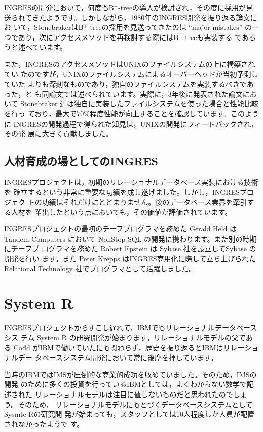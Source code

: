 INGRESの開発において，何度もB$^+$-treeの導入が検討され，その度に採用が見
送られてきたようです。しかしながら，1980年のINGRES開発を振り返る論文にお
いて，StonebrakerはB$^+$-treeの採用を見送ってきたのは ``major mistakes''
の一つであり，次にアクセスメソッドを再検討する際にはB$^+$-treeも実装する
であろうと述べています。


また，INGRESのアクセスメソッドはUNIXのファイルシステムの上に構築されてい
たのですが，UNIXのファイルシステムによるオーバーヘッドが当初予測していた
よりも深刻なものであり，独自のファイルシステムを実装するべきであった，と
も同論文では述べられています。実際に，3年後に発表された論文において
Stonebraker 達は独自に実装したファイルシステムを使った場合と性能比較を行っ
ており，最大で70\%程度性能が向上することを確認しています。このように
INGRESの開発過程で得られた知見は，UNIXの開発にフィードバックされ，その発
展に大きく貢献しました。


\subsection{人材育成の場としてのINGRES}


INGRESプロジェクトは，初期のリレーショナルデータベース実装における技術を
確立するという非常に重要な功績を成し遂げました。しかし，INGRESプロジェク
トの功績はそれだけにとどまりません。後のデータベース業界を牽引する人材を
輩出したという点においても，その価値が評価されています。


INGRESプロジェクトの最初のチーフプログラマを務めた Gerald Held はTandem
Computers において NonStop SQL の開発に携わります。また別の時期にチーフプ
ログラマを務めた Robert Epstein は Sybase 社を設立してSybase の開発を行い
ます。また Peter Krepps はINGRES商用化に際して立ち上げられた Relational
Technology 社でプログラマとして活躍しました。


\section{System R}


INGRESプロジェクトからすこし遅れて，IBMでもリレーショナルデータベースシス
テム System R の研究開発が始まります。リレーショナルモデルの父である
Codd がIBMで働いていたにも関わらず，歴史を振り返るとIBMはリレーショナルデー
タベースシステム開発において常に後塵を拝しています。


当時のIBMではIMSが圧倒的な商業的成功を収めていました。そのため，IMSの開発
のために多くの投資を行っているIBMとしては，よくわからない数学で記述された
リレーショナルモデルは注目に値しないものだと思われたのでしょう。そのため，
リレーショナルモデルにもとづくデータベースシステムとしてSysmte Rの研究開
発が始まっても，スタッフとしては10人程度しか人員が配置されなかったようで
す。


